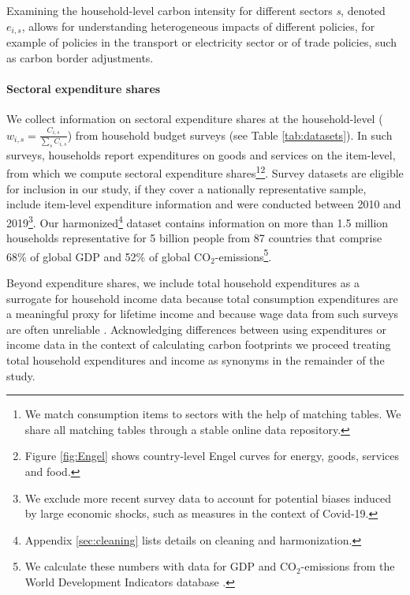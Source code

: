 \documentclass[12pt, a4paper]{article}
\begin{document}
Examining the household-level carbon intensity for different sectors \textit{s}, denoted $e_{i,s}$, allows for understanding heterogeneous impacts of different policies, for example of policies in the transport or electricity sector or of trade policies, such as carbon border adjustments.

\paragraph{Sectoral expenditure shares} We collect information on sectoral expenditure shares at the household-level ($w_{i,s}=\frac{C_{i,s}}{\sum_{s}C_{i,s}}$) from household budget surveys (see Table \ref{tab:datasets}). In such surveys, households report expenditures on goods and services on the item-level, from which we compute sectoral expenditure shares\footnote{We match consumption items to sectors with the help of matching tables. We share all matching tables through a stable online data repository.}\footnote{Figure \ref{fig:Engel} shows country-level Engel curves for energy, goods, services and food.}.
Survey datasets are eligible for inclusion in our study, if they cover a nationally representative sample, include item-level expenditure information and were conducted between 2010 and 2019\footnote{We exclude more recent survey data to account for potential biases induced by large economic shocks, such as measures in the context of Covid-19.}. Our harmonized\footnote{Appendix \ref{sec:cleaning} lists details on cleaning and harmonization.} dataset contains information on more than 1.5 million households representative for 5 billion people from 87 countries that comprise 68\% of global GDP and 52\% of global CO$_{2}$-emissions\footnote{We calculate these numbers with data for GDP and CO$_{2}$-emissions from the World Development Indicators database \autocite{WorldBankGroup.2023}.}.

Beyond expenditure shares, we include total household expenditures as a surrogate for household income data because total consumption expenditures are a meaningful proxy for lifetime income \autocite{Poterba.1989,Poterba.1991,Cronin.2019} and because wage data from such surveys are often unreliable \autocite{Blundell.1998}. Acknowledging differences between using expenditures or income data in the context of calculating carbon footprints \autocite{Levay.2023} we proceed treating total household expenditures and income as synonyms in the remainder of the study.
\end{document}

